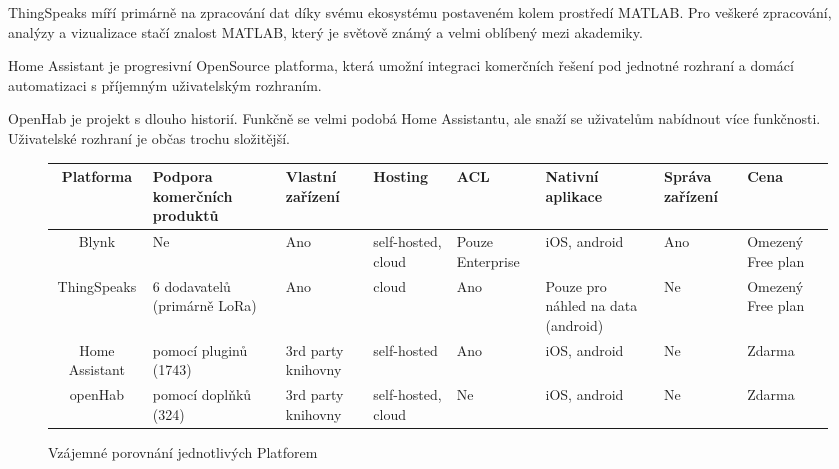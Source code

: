 ThingSpeaks míří primárně na zpracování dat díky svému ekosystému postaveném kolem prostředí MATLAB. Pro veškeré zpracování, analýzy a vizualizace stačí znalost MATLAB, který je světově známý a velmi oblíbený mezi akademiky.

Home Assistant je progresivní OpenSource platforma, která umožní integraci komerčních řešení pod jednotné rozhraní a domácí automatizaci s příjemným uživatelským rozhraním.

OpenHab je projekt s dlouho historií. Funkčně se velmi podobá Home Assistantu, ale snaží se uživatelům nabídnout více funkčnosti. Uživatelské rozhraní je občas trochu složitější.

\begin{sidewaysfigure}
    \centering
    \begin{tabular}{ |c| m{5em}| m{5em}|m{5em}|m{4em}| m{5em}| m{4em}| m{4em}| }
        \hline
        Platforma      & Podpora komerčních produktů  & Vlastní zařízení   & Hosting            & ACL              & Nativní aplikace                   & Správa zařízení & Cena              \\
        \hline
        Blynk          & Ne                           & Ano                & self-hosted, cloud & Pouze Enterprise & iOS, android                       & Ano             & Omezený Free plan \\
        \hline
        ThingSpeaks    & 6 dodavatelů (primárně LoRa) & Ano                & cloud              & Ano              & Pouze pro náhled na data (android) & Ne              & Omezený Free plan \\
        \hline
        Home Assistant & pomocí pluginů (1743)        & 3rd party knihovny & self-hosted        & Ano              & iOS, android                       & Ne              & Zdarma            \\
        \hline
        openHab        & pomocí doplňků (324)         & 3rd party knihovny & self-hosted, cloud & Ne               & iOS, android                       & Ne              & Zdarma            \\
        \hline
    \end{tabular}
    \caption{Vzájemné porovnání jednotlivých Platforem}\label{compare-table}
\end{sidewaysfigure}

